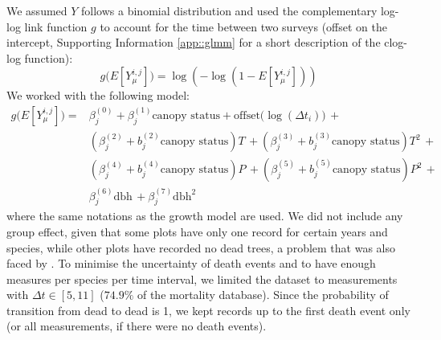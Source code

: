 We assumed $ Y $ follows a binomial distribution and used the complementary log-log link function $ g $ to account for the time between two surveys (offset on the intercept, Supporting Information \ref{app::glmm} for a short description of the clog-log function):
\[
	g \big(E[Y_\mu^{i, j}] \big) = \log \left( -\log(1 - E[Y_\mu^{i, j}]) \right)
\]
We worked with the following model:
\begin{equation}\label{eq::glmm_mortality}
\begin{split}
	g \big(E[Y_\mu^{i, j}] \big) = & \beta_{j}^{(0)}  + \beta_j^{(1)}  \text{canopy status} +
		\text{offset}\big(\log(\Delta t_i) \big) \, + \\
	& \left(\beta_j^{(2)} + b_j^{(2)} \text{canopy status} \right) T \, +
	\left(\beta_j^{(3)} + b_j^{(3)} \text{canopy status} \right) T^2 \, + \\
	& \left(\beta_j^{(4)} + b_j^{(4)} \text{canopy status} \right) P \, +
	\left(\beta_j^{(5)} + b_j^{(5)} \text{canopy status} \right) P^2 \, + \\
	& \beta_j^{(6)} \text{dbh} \, + \beta_j^{(7)} \text{dbh}^2
\end{split}
\end{equation}
where the same notations as the growth model are used. We did not include any group effect, given that some plots have only one record for certain years and species, while other plots have recorded no dead trees, a problem that was also faced by \citet{Kunstler2019}. To minimise the uncertainty of death events and to have enough measures per species per time interval, we limited the dataset to measurements with $ \Delta t \in [5, 11] $ ($ 74.9 \% $ of the mortality database). Since the probability of transition from dead to dead is 1, we kept records up to the first death event only (or all measurements, if there were no death events). \\

